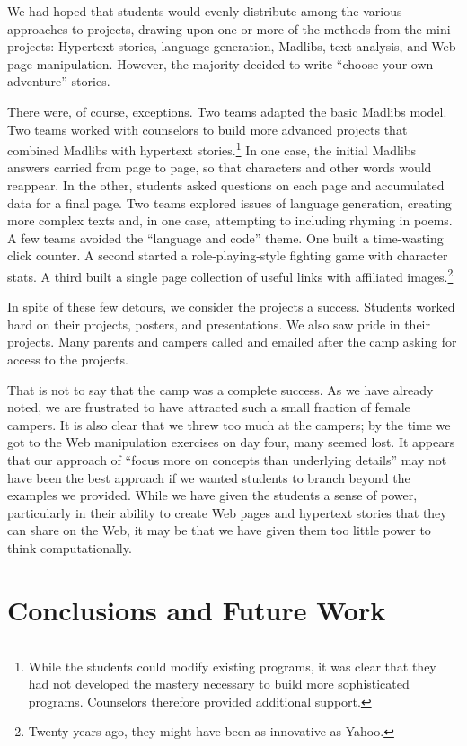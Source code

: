 We had hoped that students would evenly distribute among the various
approaches to projects, drawing upon one or more of the methods
from the mini projects: Hypertext stories, language generation, Madlibs, 
text analysis, and Web page manipulation.  However, the
majority decided to write ``choose your own adventure'' stories.

There were, of course, exceptions.  Two teams adapted the basic Madlibs 
model.  Two teams worked with counselors to build more advanced
projects that combined Madlibs with hypertext stories.\footnote{While
the students could modify existing programs, it was clear that they
had not developed the mastery necessary to build more sophisticated
programs.  Counselors therefore provided additional support.}
In one case, the initial Madlibs answers carried from page to page,
so that characters and other words would reappear.  In the other,
students asked questions on each page and accumulated data for a
final page.  Two teams explored issues of language generation,
creating more complex texts and, in one case, attempting to including
rhyming in poems.  
A few teams avoided the ``language and code'' theme.
One built a time-wasting click counter.  A second started
a role-playing-style fighting game with character stats.  A
third built a single page collection of useful links with affiliated
images.\footnote{Twenty years ago, they might have been as
innovative as Yahoo.}

In spite of these few detours, we consider the projects a success.
Students worked hard on their projects, posters, and presentations.
We also saw pride in their projects.  Many parents and campers
called and emailed after the camp asking for access to the projects.

That is not to say that the camp was a complete success.  As we
have already noted, we are frustrated to have attracted such a small
fraction of female campers.  It is also clear that we threw too
much at the campers; by the time we got to the Web manipulation
exercises on day four, many seemed lost.  It appears that our
approach of ``focus more on concepts than underlying details'' may
not have been the best approach if we wanted students to branch
beyond the examples we provided.  While we have given the students
a sense of power, particularly in their ability to create Web pages
and hypertext stories that they can share on the Web, it may be
that we have given them too little power to think computationally.

\section{Conclusions and Future Work}

